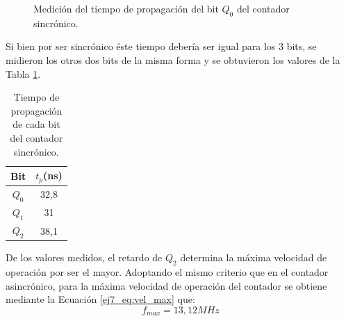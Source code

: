 \begin{figure}[H]
	\centering
	\caption{Medici\'on del tiempo de propagaci\'on del bit $Q_0$ del contador sincr\'onico.}
	\label{ej7_fig:sinc_q0_meas}
\end{figure}
\noindent
Si bien por ser sincr\'onico \'este tiempo deber\'ia ser igual para los 3 bits, se midieron los otros dos bits de la misma forma y se obtuvieron los valores de la Tabla \ref{ej7_tab:t_prop_all}.
%
\begin{table}[H]
\centering
\begin{tabular}{|c|c|}
\hline
\textbf{Bit} & \textbf{$t_p$(ns)} \\ \hline
$Q_0$           & 32,8            \\ \hline
$Q_1$           & 31              \\ \hline
$Q_2$           & 38,1            \\ \hline
\end{tabular}
\caption{Tiempo de propagaci\'on de cada bit del contador sincr\'onico.}
\label{ej7_tab:t_prop_all}
\end{table}
%
\noindent
De los valores medidos, el retardo de $Q_2$ determina la m\'axima velocidad de operaci\'on por ser el mayor. Adoptando el mismo criterio que en el contador asincr\'onico, para la m\'axima velocidad de operaci\'on del contador se obtiene mediante la Ecuaci\'on \ref{ej7_eq:vel_max} que:
\begin{equation*}
    f_{max} = 13,12MHz
\end{equation*}
%
